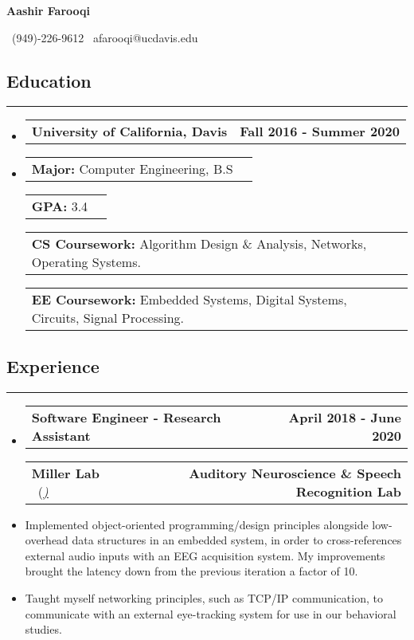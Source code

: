 \documentclass[10pt,letterpaper]{article}
\makeatletter
\newcommand{\items}[2]
{
	\begin{tabular*}{\linewidth}{l @{\extracolsep{\fill}} r}
		#1 & #2 \\
	\end{tabular*}
}
\newcommand{\header}[2]
{
	\begin{tabular*}{\linewidth}{l @{\extracolsep{\fill}} r}
		\hspace{-27pt} #1 & #2 \\
	\end{tabular*}
}
\newcommand{\sectionbreak}
{
	\vspace{-1.2em}
	\rule{\textwidth}{1.7pt}
	\vspace{-1.7em}
}
\makeatother
\begin{document}
\begin{center}
	{\LARGE \textbf{Aashir Farooqi}}

	\vspace{0.5em}
	\ (949)-226-9612 \textbar 
	\ afarooqi@ucdavis.edu\textbar
	\ \href{https://github.com/AashPointO}{\emph{\underline{}}}
	\\
\end{center}
\vspace{-20pt}


\subsection*{Education}
\sectionbreak

\begin{itemize}

	\item[] 
		\header
		{\textbf{University of California, Davis}}
		{\textbf{Fall 2016 - Summer 2020}}
	\item[]
		\vspace{-2.5pt}
	\items
		{\textbf{Major:} Computer Engineering, B.S}
		{}
	\items
		{\textbf{GPA:} 3.4}
		{}
	\items
		{\textbf{CS Coursework:} Algorithm Design \& Analysis, Networks, Operating Systems.}
		{}
	\items
		{\textbf{EE Coursework:} Embedded Systems, Digital Systems, Circuits, Signal Processing.}
		{}
		{\vspace{-0.6em}}

\end{itemize}

\vspace{-24.65pt}

\subsection*{Experience}
\sectionbreak

\begin{itemize}
	\item[]
		\header
		{\textbf{Software Engineer - Research Assistant}} 
		{\textbf{April 2018 - June 2020}}
		\header
		{\textbf{Miller Lab} \ (\href{https://millerlab.faculty.ucdavis.edu}{\small \emph{\underline{\smash{millerlab.faculty.ucdavis.edu})}}} }
		{\textbf{Auditory Neuroscience \& Speech Recognition Lab}} 
	\item
		Implemented object-oriented programming/design principles alongside low-overhead data structures in an embedded system, in order to cross-references external audio inputs with an EEG acquisition system. My improvements brought the latency down from the previous iteration a factor of 10.
	\item 
		Taught myself networking principles, such as TCP/IP communication, to communicate with an external eye-tracking system for use in our behavioral studies. 

\end{itemize}
\end{document}
